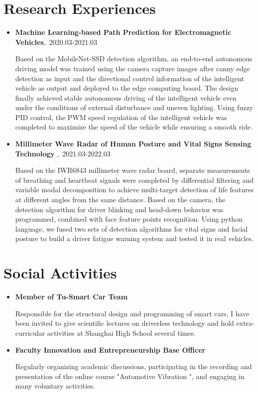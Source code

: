 \documentclass{resume}
\begin{document}
\section{Research Experiences}
\begin{itemize}[parsep=0.2ex]
  \item \textbf{Machine Learning-based Path Prediction for Electromagnetic Vehicles},\ 2020.03-2021.03  \par
Based on the MobileNet-SSD detection algorithm, an end-to-end autonomous driving model was trained using the camera capture images after canny edge detection as input and the directional control information of the intelligent vehicle as output and deployed to the edge computing board. The design finally achieved stable autonomous driving of the intelligent vehicle even under the conditions of external disturbance and uneven lighting. Using fuzzy PID control, the PWM speed regulation of the intelligent vehicle was completed to maximize the speed of the vehicle while ensuring a smooth ride.

  \item \textbf{Millimeter Wave Radar of Human Posture and Vital Signs Sensing Technology },\ 2021.03-2022.03  \par
Based on the IWR6843 millimeter wave radar board, separate measurements of breathing and heartbeat signals were completed 
by differential filtering and variable modal decomposition to achieve multi-target detection of life features at different angles from the same distance. Based on the camera, the detection algorithm for driver blinking and head-down behavior was programmed, combined with face feature points recognition. Using python language, we fused two sets of detection algorithms for vital signs and facial posture to build a driver fatigue warning system and tested it in real vehicles.
\end{itemize}


\section{Social Activities}
\begin{itemize}[parsep=0.2ex]
  \item \textbf{Member of Tu-Smart Car Team}  \par
Responsible for the structural design and programming of smart cars, I have been invited to give scientific lectures on
driverless technology and hold extra-curricular activities at Shanghai High School several times.

 \item  \textbf{Faculty Innovation and Entrepreneurship Base Officer} \par
Regularly organizing academic discussions, participating in the recording and presentation of the online course "Automotive
Vibration ", and engaging in many voluntary activities.

\end{itemize}

%
%
\end{document}
